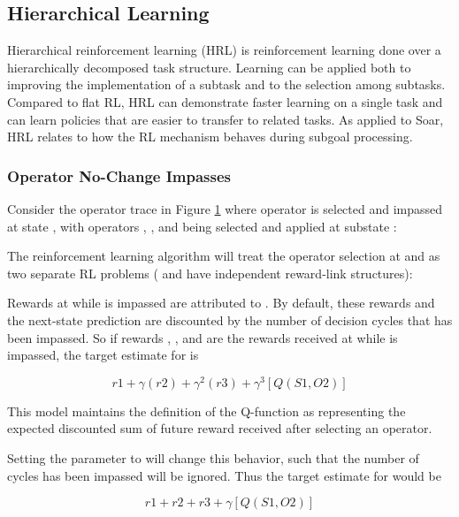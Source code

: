 \subsection{Hierarchical Learning}
\label{RL-hrl}

Hierarchical reinforcement learning (HRL) is reinforcement learning done over a hierarchically decomposed task structure. Learning can be applied both to improving the implementation of a subtask and to the selection among subtasks. Compared to flat RL, HRL can demonstrate faster learning on a single task and can learn policies that are easier to transfer to related tasks. As applied to Soar, HRL relates to how the RL mechanism behaves during subgoal processing.

\subsubsection{Operator No-Change Impasses}
Consider the operator trace in Figure \ref{fig:rl-optrace} where operator  is selected and impassed at state , with operators , , and  being selected and applied at substate :

\begin{figure}
\label{fig:rl-optrace}
\end{figure}

The reinforcement learning algorithm will treat the operator selection at  and  as two separate RL problems ( and  have independent reward-link structures):

\begin{list}{S1}
\item Rewards at  while  is impassed are attributed to . By default, these rewards and the next-state prediction are discounted by the number of decision cycles that  has been impassed.  So if rewards , , and  are the rewards received at  while  is impassed, the target estimate for  is

$$r1 + \gamma(r2) + \gamma^2(r3) + \gamma^3[  Q(S1, O2)  ]$$

This model maintains the definition of the Q-function as representing the expected discounted sum of future reward received after selecting an operator.

Setting the  parameter to  will change this behavior, such that the number of cycles  has been impassed will be ignored.  Thus the target estimate for  would be

$$r1 + r2 + r3 + \gamma[  Q(S1, O2)  ]$$

\end{list}

